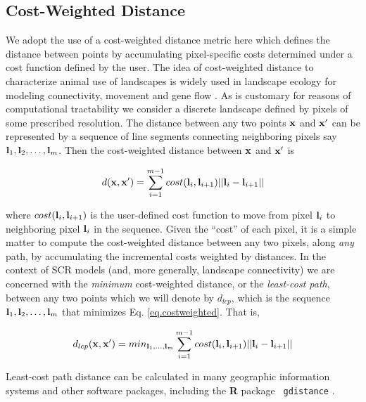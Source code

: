 \documentclass[12pt]{article}
\begin{document}
\begin{spacing}{1.8}
\section{Cost-Weighted Distance}

We adopt the use of a cost-weighted distance metric here which defines
the distance between points by accumulating pixel-specific costs
determined under a cost function defined by the user.  The idea of
cost-weighted distance to characterize animal use of landscapes is
widely used in landscape ecology for modeling connectivity, movement
and gene flow \citep{beier_etal:2008}. As is customary for reasons of
computational tractability we consider a discrete landscape defined by
pixels 
of some prescribed resolution. The distance between any two
points ${\bf x}$ and ${\bf x}'$ can be represented by a sequence of
line segments connecting neighboring pixels say ${\bf l}_{1},{\bf
  l}_{2},\ldots,{\bf l}_{m}$. Then the cost-weighted distance between
${\bf x}$ and ${\bf x}'$ is

\begin{equation}
 d({\bf x},{\bf x}')
  =  \sum_{i=1}^{m-1} cost({\bf l}_{i},{\bf l}_{i+1})||{\bf l}_{i} - {\bf l}_{i+1}||
\label{eq.costweighted}
\end{equation}

{\flushleft
where } $cost({\bf l}_{i},{\bf l}_{i+1})$ is the user-defined cost function
to move
from pixel ${\bf l}_{i}$ to neighboring pixel ${\bf l}_{i}$ in the sequence.
Given the ``cost'' of each pixel, it is a simple matter to compute the
cost-weighted distance between any two pixels, along {\it any} path,
by accumulating the incremental  costs weighted by
distances.
In the context of
SCR models (and, more generally, landscape
connectivity) we are concerned with the {\it minimum} cost-weighted
distance, or the {\it least-cost path}, between any two points which
we will denote by $d_{lcp}$, which is
the
sequence ${\bf l}_{1},{\bf l}_{2},\ldots,{\bf l}_{m}$ that minimizes
Eq. \ref{eq.costweighted}. That is,

\begin{equation}
 d_{lcp}({\bf x},{\bf x}')
  =  min_{{\bf l}_{1},\ldots,{\bf l}_{m}}  \sum_{i=1}^{m-1} cost({\bf l}_{i},{\bf l}_{i+1})||{\bf l}_{i} - {\bf l}_{i+1}||
\label{eq.lcp}
\end{equation}

{\flushleft
 Least-cost} path distance can be calculated in
 many geographic information systems and other software packages,
including the {\bf R} package \mbox{\tt
  gdistance} \citep{vanetten:2011}.



\end{spacing}
\end{document}
